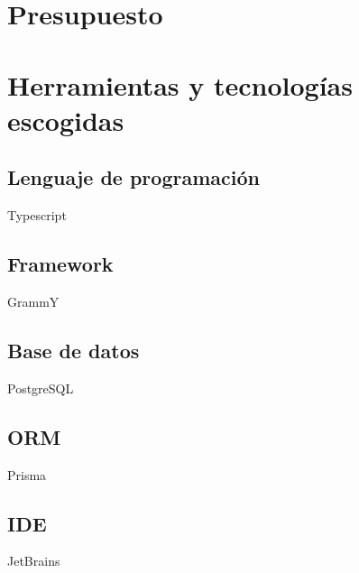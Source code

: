 \section{Presupuesto}



\section{Herramientas y tecnologías escogidas}


\subsection{Lenguaje de programación}
Typescript

\subsection{Framework}
GrammY

\subsection{Base de datos}
PostgreSQL

\subsection{ORM}
Prisma

\subsection{IDE}
JetBrains










